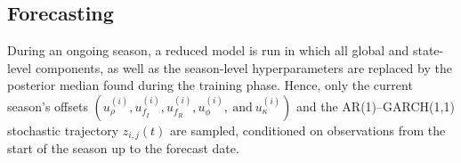 \documentclass[11pt]{article}
\begin{document}
\subsection*{Forecasting}
 
During an ongoing season, a reduced model is run in which all global and state-level components, as well as the season-level hyperparameters are replaced by the posterior median found during the training phase. Hence, only the current season's offsets $\left(u^{(i)}_\rho, u^{(i)}_{f_I}, u^{(i)}_{f_R}, u^{(i)}_{\phi},\ \text{and}\ u^{(i)}_{\kappa}\right)$ and the AR(1)--GARCH(1,1) stochastic trajectory $z_{i,j}(t)$ are sampled, conditioned on observations from the start of the season up to the forecast date.\\



\end{document}
